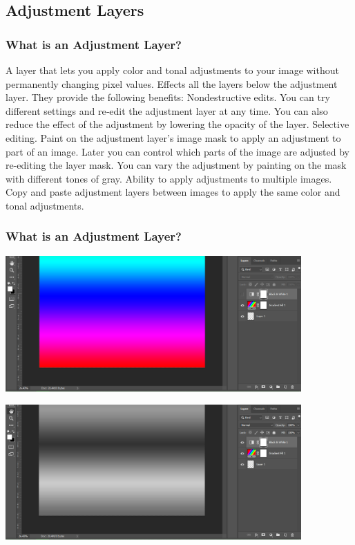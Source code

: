 \documentclass{beamer}
\begin{document}
\subsection{Adjustment Layers}
\begin{frame}
	\frametitle{What is an Adjustment Layer?}
	\begin{outline}
		\1 A layer that lets you apply color and tonal adjustments to your image without permanently changing pixel values.
		\1 Effects all the layers below the adjustment layer.
		\1 They provide the following benefits:
		\2 Nondestructive edits. You can try different settings and re‑edit the adjustment layer at any time. You can also reduce the effect of the adjustment by lowering the opacity of the layer.
		\2 Selective editing. Paint on the adjustment layer's image mask to apply an adjustment to part of an image. Later you can control which parts of the image are adjusted by re-editing the layer mask. You can vary the adjustment by painting on the mask with different tones of gray.
		\2 Ability to apply adjustments to multiple images. Copy and paste adjustment layers between images to apply the same color and tonal adjustments.
	\end{outline}
\end{frame}

\begin{frame}
	\frametitle{What is an Adjustment Layer?}
		\begin{center}
		\includegraphics[width = 0.85\textwidth]{images/adjustment2.png}
	\end{center}
	\begin{center}
		\includegraphics[width = 0.85\textwidth]{images/adjustment1.png}
	\end{center}
\end{frame}
\end{document}
